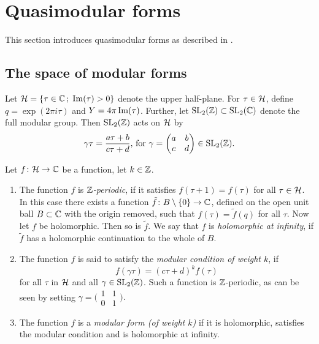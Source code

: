 \section{Quasimodular forms}

This section introduces quasimodular forms as described in \cite{Kaneko-Zagier1995}.

\subsection{The space of modular forms}

Let $\mathcal{H}=\{\tau \in \mathbb{C} \,;\; \operatorname{Im}(\tau)>0\}$ denote the upper half-plane. For $\tau \in \mathcal{H}$, define $q=\exp(2\pi i\tau)$ and $Y=4\pi\operatorname{Im}(\tau)$. Further, let $\operatorname{SL}_2(\mathbb{Z}) \subset \operatorname{SL}_2(\mathbb{C})$ denote the full modular group. Then $\operatorname{SL}_2(\mathbb{Z})$ acts \if\footnotemark\fi on $\mathcal{H}$ by 
\[\gamma\tau = \frac{a\tau + b}{c\tau + d}\text{, for }\gamma = 
\begin{pmatrix}
 a & b \\
 c & d
\end{pmatrix}
\in \operatorname{SL}_2(\mathbb{Z}). 
\]


\begin{defi} Let $f\colon \mathcal{H} \to \mathbb{C}$ be a function, let $k\in \mathbb{Z}$.
 \begin{enumerate} 
  \item The function $f$ is \emph{$\mathbb{Z}$-periodic}, if it satisfies $f(\tau + 1) = f(\tau)$ for all $\tau \in \mathcal{H}$. In this case there exists a  function $\tilde f\colon B\setminus \{0\} \to \mathbb{C}$, defined on the open unit ball $B\subset \mathbb{C}$ with the origin removed, such that $f(\tau)=\tilde f(q)$ for all $\tau$. Now let $f$ be holomorphic. Then so is $\tilde f$. We say that $f$ is \emph{holomorphic at infinity}, if $\tilde f$ has a holomorphic continuation to the whole of $B$.
  
  \item The function $f$ is said to satisfy the \emph{modular condition of weight $k$}, if \[f(\gamma\tau)=(c\tau+d)^kf(\tau)\] for all $\tau$ in $\mathcal{H}$ and all $\gamma \in \operatorname{SL}_2(\mathbb{Z})$. Such a function is $\mathbb{Z}$-periodic, as can be seen by setting $\gamma = 
\bigl(\begin{smallmatrix}
 1 & 1 \\
 0 & 1
\end{smallmatrix}\bigr).$
  
  \item The function $f$ is a \emph{modular form (of weight $k$)} if it is holomorphic, satisfies the modular condition and is holomorphic at infinity.
 \end{enumerate}
\end{defi}

